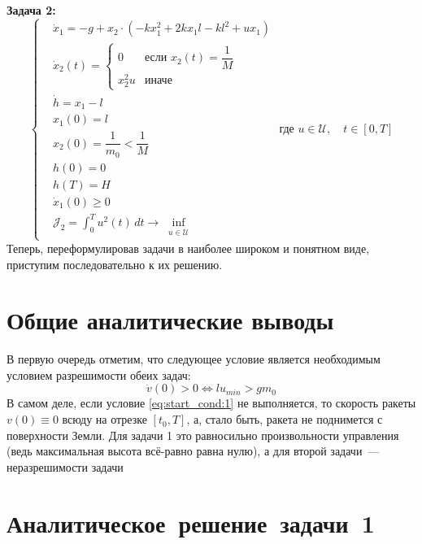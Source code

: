 \documentclass[11pt, oneside, final]{article}
\theoremstyle{break}
\numberwithin{equation}{section}
\theoremstyle{plain}
\theoremstyle{definition}
\begin{document}
    \\
    \textbf{Задача 2:}
    \begin{equation}
        \label{eq:task2_final}
        \left\{
        \begin{aligned}
           &\dot x_1 = -g + x_2 \cdot \left(-kx_1^2 + 2kx_1l - kl^2 + ux_1\right) \\
           &\dot x_2(t) = \begin{cases} 0& \text{если $x_2(t) = \dfrac{1}{M}$} \\ 
                                x_2^2u& \text{иначе}
                    \end{cases} \\
            &\dot h = x_1 - l\\
            &x_1(0) = l \\
            &x_2(0)= \dfrac{1}{m_0} < \dfrac{1}{M} \\
            &h(0) = 0 \\
            &h(T) = H \\
            &\dot x_1(0) \geqslant 0 \\
            &\mathcal{J}_2 = \int_0^T{u^2(t)\,dt} \rightarrow \inf_{\substack{u \in \mathcal{U}}}
        \end{aligned}
        \right.
        \text{ где }u \in \mathcal{U},\quad t \in [0, T]
    \end{equation}
    Теперь, переформулировав задачи в наиболее широком и понятном виде, приступим последовательно к их решению.
    \section{Общие аналитические выводы}
    В первую очередь отметим, что следующее условие является необходимым условием разрешимости обеих задач:
    \begin{equation}
        \label{eq:start_cond:1}
        \dot v(0) > 0 \Leftrightarrow lu_{min} > gm_0
    \end{equation}
    В самом деле, если условие \eqref{eq:start_cond:1} не выполняется, то скорость ракеты \(v(0) \equiv 0\) всюду на отрезке \([t_0, T]\), а, стало быть, ракета не поднимется с поверхности Земли. Для задачи 1 это равносильно произвольности управления (ведь максимальная высота всё-равно равна нулю), а для второй задачи~--- неразрешимости задачи
    \section{Аналитическое~решение~задачи~1}
    \label{sec:task1}
\end{document}
